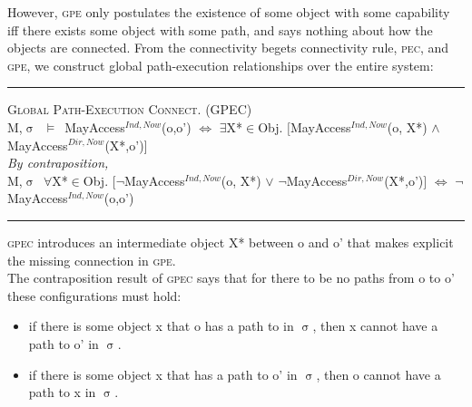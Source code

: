 \documentclass[a4paper,11pt, twoside,twocolumn]{article}
\newenvironment{logic}[1][]
{\begin{flushleft} \small }
{\end{flushleft}}
\newcommand{\loin}{$\in$}
\newcommand{\loforall}{$\forall$}
\newcommand{\loexists}{$\exists$}
\newcommand{\loand}{$\land$}
\newcommand{\loor} {$\lor$}
\newcommand{\losigma}{$\upsigma$}
\newcommand{\loturns} {$\vDash$}
\newcommand{\loiff} {$\iff$}
\newcommand{\loneg}{$\boldsymbol \neg$}
\newcommand{\ablock} {\null\qquad}
\begin{document}
However, \textsc{gpe} only postulates the existence of some object with some capability iff there exists some object with some path, and says nothing about how the objects are connected. From the connectivity begets connectivity rule, \textsc{pec}, and \textsc{gpe}, we construct global path-execution relationships over the entire system:
\begin{logic}
\hrule\null
\textsc{\normalsize *Global Path-Execution Connect. (GPEC)}\\
M,\losigma\ \loturns\ MayAccess$^{Ind,Now}$(o,o')\linebreak
\ablock \loiff\linebreak
\ablock \loexists X*\loin{Obj}. $[$MayAccess$^{Ind,Now}$(o, X*) \loand\linebreak
\ablock \ablock \ablock \quad MayAccess$^{Dir,Now}$(X*,o')$]$
\linebreak\\
\textit{By contraposition,} \\
M,\losigma\ \loforall X*\loin{Obj}. $[$\loneg MayAccess$^{Ind,Now}$(o, X*) \loor\linebreak
\ablock \ablock \ablock \quad \loneg MayAccess$^{Dir,Now}$(X*,o')$]$\linebreak
\ablock \loiff\linebreak
\ablock \loneg MayAccess$^{Ind,Now}$(o,o')\linebreak
\hrule
\end{logic}
\textsc{gpec} introduces an intermediate object X* between o and o' that makes explicit the missing connection in \textsc{gpe}.\\

The contraposition result of \textsc{gpec} says that for there to be no paths from o to o' these configurations must hold:
\begin{itemize}\setlength\itemsep{0.5em}
\item if there is some object x that o has a path to in \losigma, then x cannot have a path to o' in \losigma.
\item if there is some object x that has a path to o' in \losigma, then o cannot have a path to x in \losigma.
\end{itemize}
\end{document}
